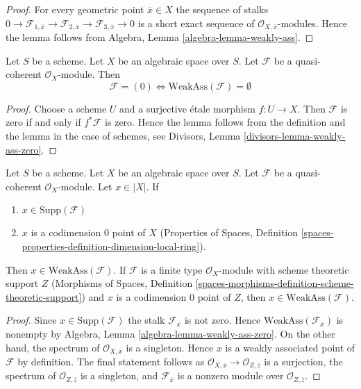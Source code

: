 \begin{proof}
For every geometric point $\overline{x} \in X$
the sequence of stalks
$0 \to \mathcal{F}_{1, \overline{x}} \to
\mathcal{F}_{2, \overline{x}} \to
\mathcal{F}_{3, \overline{x}} \to 0$
is a short exact sequence of $\mathcal{O}_{X, \overline{x}}$-modules.
Hence the lemma follows from
Algebra, Lemma \ref{algebra-lemma-weakly-ass}.
\end{proof}

\begin{lemma}
\label{lemma-weakly-ass-zero}
Let $S$ be a scheme. Let $X$ be an algebraic space over $S$.
Let $\mathcal{F}$ be a quasi-coherent $\mathcal{O}_X$-module.
Then
$$
\mathcal{F} = (0) \Leftrightarrow \text{WeakAss}(\mathcal{F}) = \emptyset
$$
\end{lemma}

\begin{proof}
Choose a scheme $U$ and a surjective \'etale morphism $f : U \to X$.
Then $\mathcal{F}$ is zero if and only if $f^*\mathcal{F}$ is zero.
Hence the lemma follows from the definition and the lemma in the
case of schemes, see
Divisors, Lemma \ref{divisors-lemma-weakly-ass-zero}.
\end{proof}

\begin{lemma}
\label{lemma-minimal-support-in-weakly-ass}
Let $S$ be a scheme. Let $X$ be an algebraic space over $S$.
Let $\mathcal{F}$ be a quasi-coherent $\mathcal{O}_X$-module.
Let $x \in |X|$. If
\begin{enumerate}
\item $x \in \text{Supp}(\mathcal{F})$
\item $x$ is a codimension $0$ point of $X$
(Properties of Spaces, Definition
\ref{spaces-properties-definition-dimension-local-ring}).
\end{enumerate}
Then $x \in \text{WeakAss}(\mathcal{F})$. If $\mathcal{F}$
is a finite type $\mathcal{O}_X$-module with scheme theoretic support $Z$
(Morphisms of Spaces, Definition
\ref{spaces-morphisms-definition-scheme-theoretic-support})
and $x$ is a codimension $0$ point of $Z$, then
$x \in \text{WeakAss}(\mathcal{F})$.
\end{lemma}

\begin{proof}
Since $x \in \text{Supp}(\mathcal{F})$ the stalk
$\mathcal{F}_{\overline{x}}$ is not zero. Hence
$\text{WeakAss}(\mathcal{F}_{\overline{x}})$
is nonempty by
Algebra, Lemma \ref{algebra-lemma-weakly-ass-zero}.
On the other hand, the spectrum of $\mathcal{O}_{X, \overline{x}}$
is a singleton. Hence $x$ is a weakly associated point of
$\mathcal{F}$ by definition. The final statement follows
as $\mathcal{O}_{X, \overline{x}} \to \mathcal{O}_{Z, \overline{z}}$
is a surjection, the spectrum of $\mathcal{O}_{Z, \overline{z}}$
is a singleton, and $\mathcal{F}_{\overline{x}}$ is a nonzero
module over $\mathcal{O}_{Z, \overline{z}}$.
\end{proof}

